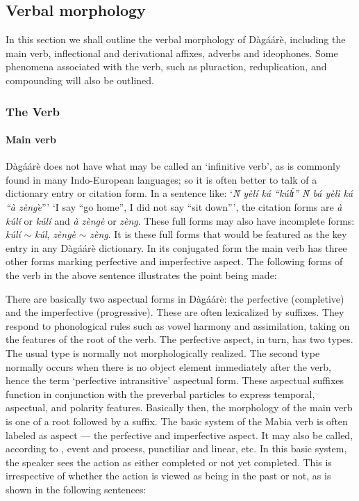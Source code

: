 \begin{refsection}
\subsection{Verbal morphology}
In this section we shall outline the verbal morphology of Dàgáárè, including the main
verb, inflectional and derivational affixes, adverbs and ideophones. Some phenomena
associated with the verb, such as pluraction, reduplication, and compounding will also be
outlined.

\subsubsection{ The Verb}
\paragraph{ Main verb}
Dàgáárè does not have what may be called an ‘infinitive verb’, as is commonly found
in many Indo-European languages; so it is often better to talk of a dictionary entry or citation
form. In a sentence like: ‘\textit{Ǹ yèlí ká “kúlɪ́” Ǹ bá yèlì ká “à zènge}̀”’ ‘I say “go home”, I did
not say “sit down”’, the citation forms are \textit{à kúlí} or \textit{kúlí} and   \textit{à zèngè} or \textit{zèng}. These full forms may also have incomplete forms: \textit{kúlí}  $\sim$ \textit{kúl}, \textit{zèngè}  $\sim$ \textit{zèng}. It is these full forms
that would be featured as the key entry in any Dàgáárè dictionary.
In its conjugated form the main verb has three other forms marking perfective and
imperfective aspect. The following forms of the verb in the above sentence illustrates the
point being made:

\ea {}
\z\z


There are basically two aspectual forms in Dàgáárè: the perfective (completive) and the
imperfective (progressive). These are often lexicalized by suffixes. They respond to
phonological rules such as vowel harmony and assimilation, taking on the features of the root
of the verb. The perfective aspect, in turn, has two types. The usual type is normally not
morphologically realized. The second type normally occurs when there is no object element
immediately after the verb, hence the term ‘perfective intransitive’ aspectual form. These
aspectual suffixes function in conjunction with the preverbal particles to express temporal,
aspectual, and polarity features. Basically then, the morphology of the main verb is one of a
root followed by a suffix.
The basic system of the Mabia verb is often labeled as aspect — the perfective and
imperfective aspect. It may also be called, according to \citep{Bendor-Samuel1971}, event and
process, punctiliar and linear, etc. In this basic system, the speaker sees the action as either
completed or not yet completed. This is irrespective of whether the action is viewed as being
in the past or not, as is shown in the following sentences:


\end{refsection}
